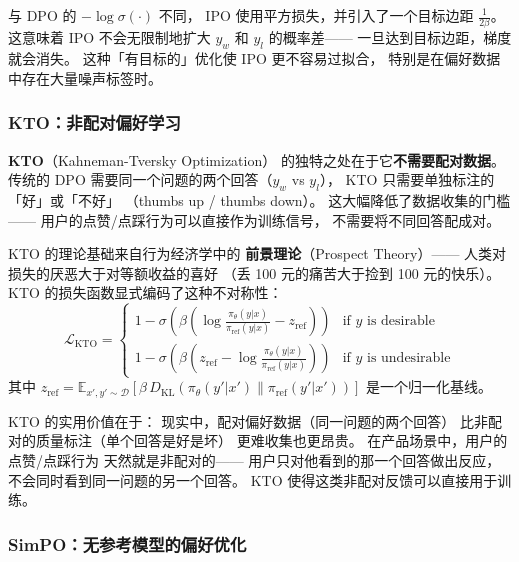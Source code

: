与 DPO 的 $-\log\sigma(\cdot)$ 不同，
IPO 使用平方损失，并引入了一个目标边距 $\frac{1}{2\beta}$。
这意味着 IPO 不会无限制地扩大 $y_w$ 和 $y_l$ 的概率差——
一旦达到目标边距，梯度就会消失。
这种「有目标的」优化使 IPO 更不容易过拟合，
特别是在偏好数据中存在大量噪声标签时。

\subsubsection{KTO：非配对偏好学习}

\textbf{KTO}（Kahneman-Tversky Optimization）
的独特之处在于它\textbf{不需要配对数据}。
传统的 DPO 需要同一个问题的两个回答（$y_w$ vs $y_l$），
KTO 只需要单独标注的「好」或「不好」
（thumbs up / thumbs down）。
这大幅降低了数据收集的门槛——
用户的点赞/点踩行为可以直接作为训练信号，
不需要将不同回答配成对。


KTO 的理论基础来自行为经济学中的
\textbf{前景理论}（Prospect Theory）——
人类对损失的厌恶大于对等额收益的喜好
（丢 100 元的痛苦大于捡到 100 元的快乐）。
KTO 的损失函数显式编码了这种不对称性：
\begin{equation}
  \mathcal{L}_{\text{KTO}} = \begin{cases}
    1 - \sigma\!\left(\beta \left(
      \log \frac{\pi_\theta(y|x)}{\pi_{\text{ref}}(y|x)} - z_{\text{ref}}
    \right)\right) & \text{if } y \text{ is desirable} \\[6pt]
    1 - \sigma\!\left(\beta \left(
      z_{\text{ref}} - \log \frac{\pi_\theta(y|x)}{\pi_{\text{ref}}(y|x)}
    \right)\right) & \text{if } y \text{ is undesirable}
  \end{cases}
  \label{eq:kto}
\end{equation}
其中 $z_{\text{ref}} = \mathbb{E}_{x',y' \sim \mathcal{D}}
\left[\beta \, D_{\text{KL}}(\pi_\theta(y'|x') \| \pi_{\text{ref}}(y'|x'))\right]$
是一个归一化基线。

KTO 的实用价值在于：
现实中，配对偏好数据（同一问题的两个回答）
比非配对的质量标注（单个回答是好是坏）
更难收集也更昂贵。
在产品场景中，用户的点赞/点踩行为
天然就是非配对的——
用户只对他看到的那一个回答做出反应，
不会同时看到同一问题的另一个回答。
KTO 使得这类非配对反馈可以直接用于训练。

\subsubsection{SimPO：无参考模型的偏好优化}

